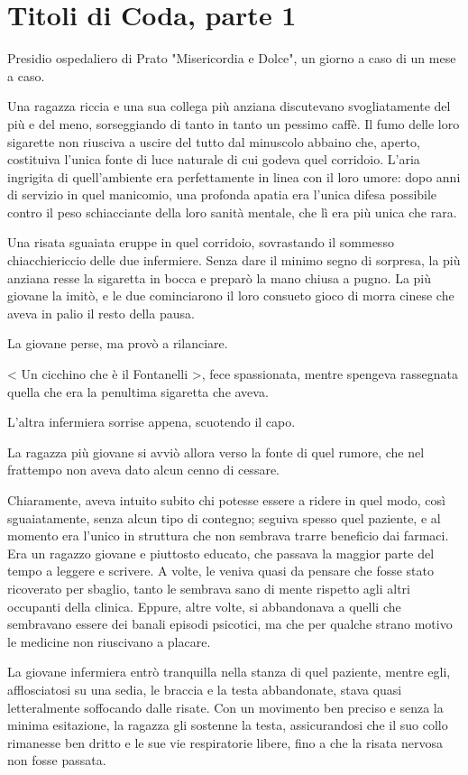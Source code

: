 \chapter{Titoli di Coda, parte 1}

Presidio ospedaliero di Prato "Misericordia e Dolce", un giorno a caso di un mese a caso.

Una ragazza riccia e una sua collega più anziana discutevano svogliatamente del più e del meno, sorseggiando di tanto in tanto un pessimo caffè. Il fumo delle loro sigarette non riusciva a uscire del tutto dal minuscolo abbaino che, aperto, costituiva l'unica fonte di luce naturale di cui godeva quel corridoio. L'aria ingrigita di quell'ambiente era perfettamente in linea con il loro umore: dopo anni di servizio in quel manicomio, una profonda apatia era l'unica difesa possibile contro il peso schiacciante della loro sanità mentale, che lì era più unica che rara.

Una risata sguaiata eruppe in quel corridoio, sovrastando il sommesso chiacchiericcio delle due infermiere. Senza dare il minimo segno di sorpresa, la più anziana resse la sigaretta in bocca e preparò la mano chiusa a pugno. La più giovane la imitò, e le due cominciarono il loro consueto gioco di morra cinese che aveva in palio il resto della pausa.

La giovane perse, ma provò a rilanciare.

< Un cicchino che è il Fontanelli >, fece spassionata, mentre spengeva rassegnata quella che era la penultima sigaretta che aveva.

L'altra infermiera sorrise appena, scuotendo il capo.

La ragazza più giovane si avviò allora verso la fonte di quel rumore, che nel frattempo non aveva dato alcun cenno di cessare. 

Chiaramente, aveva intuito subito chi potesse essere a ridere in quel modo, così sguaiatamente, senza alcun tipo di contegno; seguiva spesso quel paziente, e al momento era l'unico in struttura che non sembrava trarre beneficio dai farmaci. Era un ragazzo giovane e piuttosto educato, che passava la maggior parte del tempo a leggere e scrivere. A volte, le veniva quasi da pensare che fosse stato ricoverato per sbaglio, tanto le sembrava sano di mente rispetto agli altri occupanti della clinica. Eppure, altre volte, si abbandonava a quelli che sembravano essere dei banali episodi psicotici, ma che per qualche strano motivo le medicine non riuscivano a placare.

La giovane infermiera entrò tranquilla nella stanza di quel paziente, mentre egli, afflosciatosi su una sedia, le braccia e la testa abbandonate, stava quasi letteralmente soffocando dalle risate. Con un movimento ben preciso e senza la minima esitazione, la ragazza gli sostenne la testa, assicurandosi che il suo collo rimanesse ben dritto e le sue vie respiratorie libere, fino a che la risata nervosa non fosse passata.

